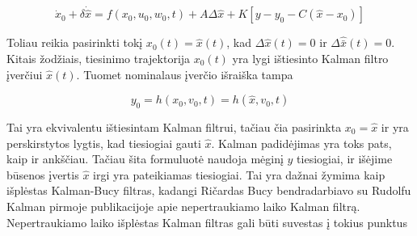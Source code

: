         \begin{equation}
            \dot{x}_0 + \delta \dot{\hat{x}} = f(x_0, u_0, w_0, t) + A \Delta \hat{x} + K[y-y_0 -C(\hat{x} - x_0)]
        \end{equation}

        Toliau reikia pasirinkti tokį $x_0(t)=\hat{x}(t)$, kad $\Delta\hat{x}(t) = 0$ ir $\Delta\hat{\bar{x}}(t) = 0$.
        Kitais žodžiais, tiesinimo trajektorija $x_0(t)$ yra lygi ištiesinto Kalman filtro įverčiui $\hat{x}(t)$.
        Tuomet nominalaus įverčio išraiška tampa

        \begin{equation}
            y_0 = h(x_0, v_0, t) = h(\hat{x}, v_0, t)
        \end{equation}

        Tai yra ekvivalentu ištiesintam Kalman filtrui, tačiau čia pasirinkta $x_0 = \hat{x}$ ir yra perskirstytos lygtis, kad tiesiogiai gauti $\hat{x}$.
        Kalman padidėjimas yra toks pats, kaip ir ankščiau.
        Tačiau šita formuluotė naudoja mėginį $y$ tiesiogiai, ir išėjime būsenos įvertis $\hat{x}$ irgi yra pateikiamas tiesiogiai.
        Tai yra dažnai žymima kaip išplėstas Kalman-Bucy filtras, kadangi Ričardas Bucy bendradarbiavo su Rudolfu Kalman pirmoje publikacijoje apie nepertraukiamo laiko Kalman filtrą.
        Nepertraukiamo laiko išplėstas Kalman filtras gali būti suvestas į tokius punktus

